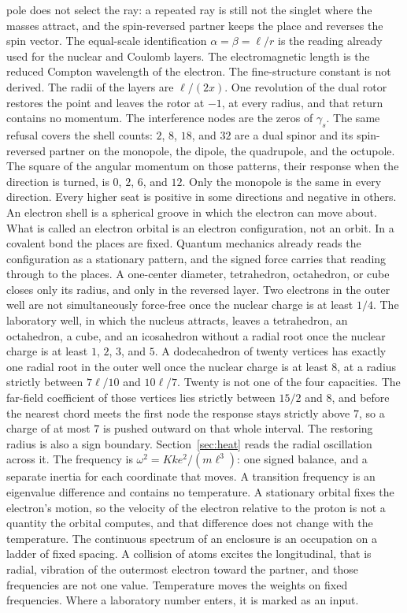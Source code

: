 \documentclass[a4paper]{article}
\begin{document}
pole does not select the ray: a repeated ray is still not the singlet where the masses attract, and the spin-reversed partner keeps the place and reverses the spin vector. The equal-scale identification \(\alpha=\beta=\ell/r\) is the reading already used for the nuclear and Coulomb layers. The electromagnetic length is the reduced Compton wavelength of the electron. The fine-structure constant is not derived. The radii of the layers are \(\ell/(2x)\). One revolution of the dual rotor restores the point and leaves the rotor at \(-1\), at every radius, and that return contains no momentum. The interference nodes are the zeros of \(\gamma_s\).  The same refusal covers the shell counts: \(2\), \(8\), \(18\), and \(32\) are a dual spinor and its spin-reversed partner on the monopole, the dipole, the quadrupole, and the octupole. The square of the angular momentum on those patterns, their response when the direction is turned, is \(0\), \(2\), \(6\), and \(12\). Only the monopole is the same in every direction. Every higher seat is positive in some directions and negative in others. An electron shell is a spherical groove in which the electron can move about. What is called an electron orbital is an electron configuration, not an orbit. In a covalent bond the places are fixed. Quantum mechanics already reads the configuration as a stationary pattern, and the signed force carries that reading through to the places. A one-center diameter, tetrahedron, octahedron, or cube closes only its radius, and only in the reversed layer. Two electrons in the outer well are not simultaneously force-free once the nuclear charge is at least \(1/4\). The laboratory well, in which the nucleus attracts, leaves a tetrahedron, an octahedron, a cube, and an icosahedron without a radial root once the nuclear charge is at least \(1\), \(2\), \(3\), and \(5\). A dodecahedron of twenty vertices has exactly one radial root in the outer well once the nuclear charge is at least \(8\), at a radius strictly between \(7\ell/10\) and \(10\ell/7\). Twenty is not one of the four capacities. The far-field coefficient of those vertices lies strictly between \(15/2\) and \(8\), and before the nearest chord meets the first node the response stays strictly above \(7\), so a charge of at most \(7\) is pushed outward on that whole interval. The restoring radius is also a sign boundary. Section~\ref{sec:heat} reads the radial oscillation across it. The frequency is \(\omega^{2}=K k e^{2}/(m\ell^{3})\): one signed balance, and a separate inertia for each coordinate that moves. A transition frequency is an eigenvalue difference and contains no temperature. A stationary orbital fixes the electron's motion, so the velocity of the electron relative to the proton is not a quantity the orbital computes, and that difference does not change with the temperature. The continuous spectrum of an enclosure is an occupation on a ladder of fixed spacing. A collision of atoms excites the longitudinal, that is radial, vibration of the outermost electron toward the partner, and those frequencies are not one value. Temperature moves the weights on fixed frequencies. Where a laboratory number enters, it is marked as an input.
\end{document}
